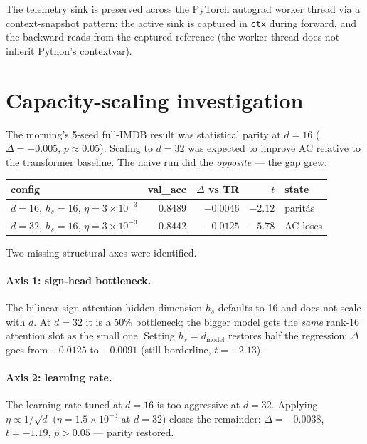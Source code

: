 \documentclass[11pt, a4paper]{article}
\begin{document}
The telemetry sink is preserved across the PyTorch autograd worker
thread via a context-snapshot pattern: the active sink is captured in
\texttt{ctx} during forward, and the backward reads from the captured
reference (the worker thread does not inherit Python's contextvar).

\section{Capacity-scaling investigation}
\label{sec:scaling}

The morning's 5-seed full-IMDB result was statistical parity at
$d = 16$ ($\Delta = -0.005$, $p \approx 0.05$). Scaling to $d = 32$
was expected to improve AC relative to the transformer baseline. The
naive run did the \emph{opposite} --- the gap grew:

\begin{center}
\begin{tabular}{lrrrl}
\toprule
config & val\_acc & $\Delta$ vs TR & $t$ & state \\
\midrule
$d=16$, $h_s=16$, $\eta=3\!\times\!10^{-3}$ & 0.8489 & $-0.0046$ & $-2.12$ & paritás \\
$d=32$, $h_s=16$, $\eta=3\!\times\!10^{-3}$ & 0.8442 & $-0.0125$ & $-5.78$ & AC loses \\
\bottomrule
\end{tabular}
\end{center}

Two missing structural axes were identified.

\paragraph{Axis 1: sign-head bottleneck.} The bilinear sign-attention
hidden dimension $h_s$ defaults to 16 and does not scale with $d$. At
$d = 32$ it is a 50\% bottleneck; the bigger model gets the \emph{same}
rank-16 attention slot as the small one. Setting
$h_s = d_{\text{model}}$ restores half the regression:
$\Delta$ goes from $-0.0125$ to $-0.0091$ (still borderline,
$t = -2.13$).

\paragraph{Axis 2: learning rate.} The learning rate tuned at $d=16$
is too aggressive at $d=32$. Applying $\eta \propto 1/\sqrt{d}$
($\eta = 1.5\!\times\!10^{-3}$ at $d=32$) closes the remainder:
$\Delta = -0.0038$, $t = -1.19$, $p > 0.05$ --- parity restored.
\end{document}
